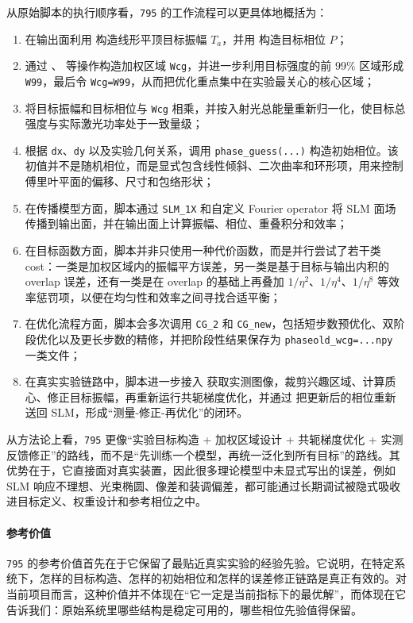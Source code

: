 \documentclass[12pt,a4paper]{ctexart}
\begin{document}
从原始脚本的执行顺序看，\texttt{795} 的工作流程可以更具体地概括为：
\begin{enumerate}[label=\arabic*.]
    \item 在输出面利用  构造线形平顶目标振幅 $T_a$，并用  构造目标相位 $P$；
    \item 通过 、 等操作构造加权区域 \texttt{Wcg}，并进一步利用目标强度的前 $99\%$ 区域形成 \texttt{W99}，最后令 \texttt{Wcg=W99}，从而把优化重点集中在实验最关心的核心区域；
    \item 将目标振幅和目标相位与 \texttt{Wcg} 相乘，并按入射光总能量重新归一化，使目标总强度与实际激光功率处于一致量级；
    \item 根据 \texttt{dx}、\texttt{dy} 以及实验几何关系，调用 \texttt{phase\_guess(...)} 构造初始相位。该初值并不是随机相位，而是显式包含线性倾斜、二次曲率和环形项，用来控制傅里叶平面的偏移、尺寸和包络形状；
    \item 在传播模型方面，脚本通过 \texttt{SLM\_1X} 和自定义 Fourier operator 将 SLM 面场传播到输出面，并在输出面上计算振幅、相位、重叠积分和效率；
    \item 在目标函数方面，脚本并非只使用一种代价函数，而是并行尝试了若干类 cost：一类是加权区域内的振幅平方误差，另一类是基于目标与输出内积的 overlap 误差，还有一类是在 overlap 的基础上再叠加 $1/\eta^2$、$1/\eta^4$、$1/\eta^8$ 等效率惩罚项，以便在均匀性和效率之间寻找合适平衡；
    \item 在优化流程方面，脚本会多次调用 \texttt{CG\_2} 和 \texttt{CG\_new}，包括短步数预优化、双阶段优化以及更长步数的精修，并把阶段性结果保存为 \texttt{phaseold\_wcg=...npy} 一类文件；
    \item 在真实实验链路中，脚本进一步接入  获取实测图像，裁剪兴趣区域、计算质心、修正目标振幅，再重新运行共轭梯度优化，并通过  把更新后的相位重新送回 SLM，形成“测量-修正-再优化”的闭环。
\end{enumerate}

从方法论上看，\texttt{795} 更像“实验目标构造 + 加权区域设计 + 共轭梯度优化 + 实测反馈修正”的路线，而不是“先训练一个模型，再统一泛化到所有目标”的路线。其优势在于，它直接面对真实装置，因此很多理论模型中未显式写出的误差，例如 SLM 响应不理想、光束椭圆、像差和装调偏差，都可能通过长期调试被隐式吸收进目标定义、权重设计和参考相位之中。

\paragraph{参考价值}
\texttt{795} 的参考价值首先在于它保留了最贴近真实实验的经验先验。它说明，在特定系统下，怎样的目标构造、怎样的初始相位和怎样的误差修正链路是真正有效的。对当前项目而言，这种价值并不体现在“它一定是当前指标下的最优解”，而体现在它告诉我们：原始系统里哪些结构是稳定可用的，哪些相位先验值得保留。
\end{document}
